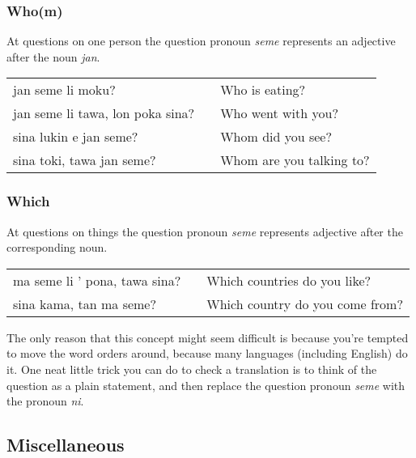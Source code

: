 \subsubsection*{Who(m)}
%
%
At questions on one person the question pronoun \textit{seme} represents an adjective after the noun \textit{jan}. 

\begin{supertabular}{p{5,5cm}|ll}
jan seme li moku? && Who is eating? \\
jan seme li tawa, lon poka sina? && Who went with you? \\
sina lukin e jan seme? && Whom did you see? \\
sina toki, tawa jan seme? && Whom are you talking to? \\
\end{supertabular} 
%
\subsubsection*{Which}
%
%
At questions on things the question pronoun \textit{seme} represents adjective after the corresponding noun. 

\begin{supertabular}{p{5,5cm}|ll}
ma seme li ' pona, tawa sina? && Which countries do you like? \\
sina kama, tan ma seme? && Which country do you come from? \\ 
\end{supertabular} 

The only reason that this concept might seem difficult is because you're tempted to move the word orders around, because many languages (including English) do it. 
One neat little trick you can do to check a translation is to think of the question as a plain statement, and then replace the question pronoun \textit{seme} with the pronoun \textit{ni}. 

%
%
%
%
\newpage
\subsection*{Miscellaneous}
%
